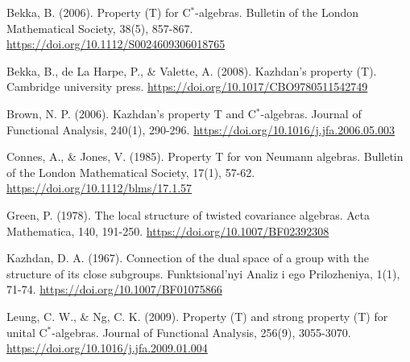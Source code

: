 \documentclass[12pt, reqno]{amsart}
\theoremstyle{definition}
\theoremstyle{remark}
\numberwithin{equation}{section}
\begin{document}

\begin{thebibliography}{99}

 Bekka, B. (2006). Property (T) for C$^*$-algebras. Bulletin of the London Mathematical Society, 38(5), 857-867.
\url{https://doi.org/10.1112/S0024609306018765}

  Bekka, B., de La Harpe, P., \& Valette, A. (2008). Kazhdan's property (T). Cambridge university press.
\url{https://doi.org/10.1017/CBO9780511542749}

 Brown, N. P. (2006). Kazhdan's property T and C$^*$-algebras. Journal of Functional Analysis, 240(1), 290-296.
\url{https://doi.org/10.1016/j.jfa.2006.05.003}


  Connes, A., \& Jones, V. (1985). Property T for von Neumann algebras. Bulletin of the London Mathematical Society, 17(1), 57-62.
\url{https://doi.org/10.1112/blms/17.1.57}

  Green, P. (1978). The local structure of twisted covariance algebras. Acta Mathematica, 140, 191-250.
\url{https://doi.org/10.1007/BF02392308}
    
 Kazhdan, D. A. (1967). Connection of the dual space of a group with the structure of its close subgroups. Funktsional'nyi Analiz i ego Prilozheniya, 1(1), 71-74.
\url{https://doi.org/10.1007/BF01075866}

 Leung, C. W., \& Ng, C. K. (2009). Property (T) and strong property (T) for unital C$^*$-algebras. Journal of Functional Analysis, 256(9), 3055-3070.
\url{https://doi.org/10.1016/j.jfa.2009.01.004}



\end{thebibliography}
\end{document}
